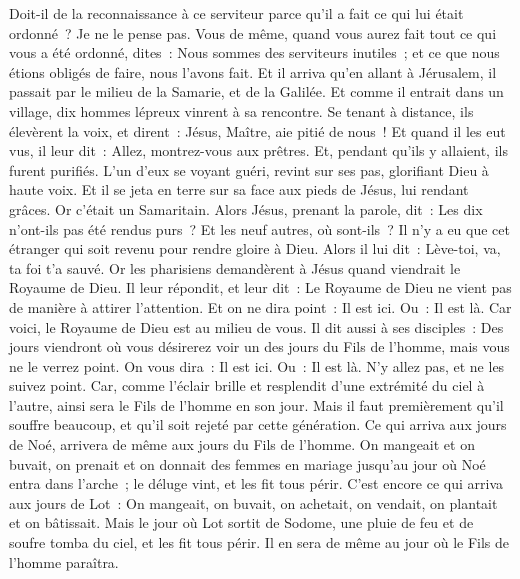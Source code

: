 \begin{multicols}{2}
Doit-il de la reconnaissance à ce serviteur parce qu'il a fait ce qui lui était ordonné~? Je ne le pense pas.
Vous de même, quand vous aurez fait tout ce qui vous a été ordonné, dites~: Nous sommes des serviteurs inutiles~; et ce que nous étions obligés de faire, nous l'avons fait.
Et il arriva qu'en allant à Jérusalem, il passait par le milieu de la Samarie, et de la Galilée.
Et comme il entrait dans un village, dix hommes lépreux vinrent à sa rencontre. Se tenant à distance, ils élevèrent la voix, et dirent~:
Jésus, Maître, aie pitié de nous~!
Et quand il les eut vus, il leur dit~: Allez, montrez-vous aux prêtres. Et, pendant qu'ils y allaient, ils furent purifiés.
L'un d'eux se voyant guéri, revint sur ses pas, glorifiant Dieu à haute voix.
Et il se jeta en terre sur sa face aux pieds de Jésus, lui rendant grâces. Or c'était un Samaritain.
Alors Jésus, prenant la parole, dit~: Les dix n'ont-ils pas été rendus purs~? Et les neuf autres, où sont-ils~?
Il n'y a eu que cet étranger qui soit revenu pour rendre gloire à Dieu.
Alors il lui dit~: Lève-toi, va, ta foi t'a sauvé.
Or les pharisiens demandèrent à Jésus quand viendrait le Royaume de Dieu. Il leur répondit, et leur dit~: Le Royaume de Dieu ne vient pas de manière à attirer l'attention.
Et on ne dira point~: Il est ici. Ou~: Il est là. Car voici, le Royaume de Dieu est au milieu de vous.
Il dit aussi à ses disciples~: Des jours viendront où vous désirerez voir un des jours du Fils de l'homme, mais vous ne le verrez point. On vous dira~:
Il est ici. Ou~: Il est là. N'y allez pas, et ne les suivez point.
Car, comme l'éclair brille et resplendit d'une extrémité du ciel à l'autre, ainsi sera le Fils de l'homme en son jour.
Mais il faut premièrement qu'il souffre beaucoup, et qu'il soit rejeté par cette génération.
Ce qui arriva aux jours de Noé, arrivera de même aux jours du Fils de l'homme.
On mangeait et on buvait, on prenait et on donnait des femmes en mariage jusqu'au jour où Noé entra dans l'arche~; le déluge vint, et les fit tous périr.
C'est encore ce qui arriva aux jours de Lot~: On mangeait, on buvait, on achetait, on vendait, on plantait et on bâtissait.
Mais le jour où Lot sortit de Sodome, une pluie de feu et de soufre tomba du ciel, et les fit tous périr.
Il en sera de même au jour où le Fils de l'homme paraîtra.

\end{multicols}
